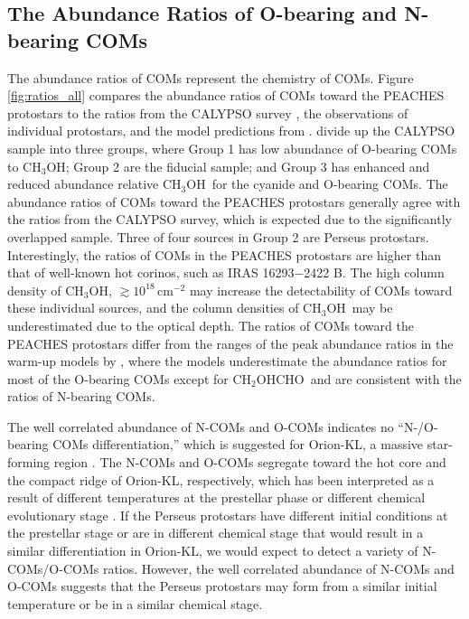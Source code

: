 \documentclass[twocolumn]{aastex62}
\newcommand{\methanol}{\mbox{CH$_{3}$OH}}
\newcommand{\glycolaldehyde}{\mbox{CH$_{2}$OHCHO}}
\begin{document}

\subsection{The Abundance Ratios of O-bearing and N-bearing COMs}
\label{sec:ratios}

The abundance ratios of COMs represent the chemistry of COMs.  Figure\,\ref{fig:ratios_all} compares the abundance ratios of COMs toward the PEACHES protostars to the ratios from the CALYPSO survey \citep{2020AA...635A.198B}, the observations of individual protostars, and the model predictions from \citet{2013ApJ...765...60G}.  \citet{2020AA...635A.198B} divide up the CALYPSO sample into three groups, where Group 1 has low abundance of O-bearing COMs to \methanol; Group 2 are the fiducial sample; and Group 3 has enhanced and reduced abundance relative \methanol\ for the cyanide and O-bearing COMs.  The abundance ratios of COMs toward the PEACHES protostars generally agree with the ratios from the CALYPSO survey, which is expected due to the significantly overlapped sample.  Three of four sources in Group 2 are Perseus protostars.  Interestingly, the ratios of COMs in the PEACHES protostars are higher than that of well-known hot corinos, such as IRAS 16293$-$2422 B.  The high column density of \methanol, $\gtrsim 10^{18}$\,cm$^{-2}$ may increase the detectability of COMs toward these individual sources, and the column densities of \methanol\ may be underestimated due to the optical depth.  The ratios of COMs toward the PEACHES protostars differ from the ranges of the peak abundance ratios in the warm-up models by \citet{2013ApJ...765...60G}, where the models underestimate the abundance ratios for most of the O-bearing COMs except for \glycolaldehyde\ and are consistent with the ratios of N-bearing COMs.

The well correlated abundance of N-COMs and O-COMs indicates no ``N-/O-bearing COMs differentiation,'' which is suggested for Orion-KL, a massive star-forming region \citep[e.g., ][]{2008Ap&SS.313...45G,2008ApJ...672..962F,2015AA...581A..71F,2018AA...620L...6T}.  The N-COMs and O-COMs segregate toward the hot core and the compact ridge of Orion-KL, respectively, which has been interpreted as a result of different temperatures at the prestellar phase or different chemical evolutionary stage \citep{1993ApJ...408..548C,2011JPCA..115.6472N,2011ApJ...728...71L,2013ApJ...765...60G}.  If the Perseus protostars have different initial conditions at the prestellar stage or are in different chemical stage that would result in a similar differentiation in Orion-KL, we would expect to detect a variety of N-COMs/O-COMs ratios.  However, the well correlated abundance of N-COMs and O-COMs suggests that the Perseus protostars may form from a similar initial temperature or be in a similar chemical stage.
\end{document}

